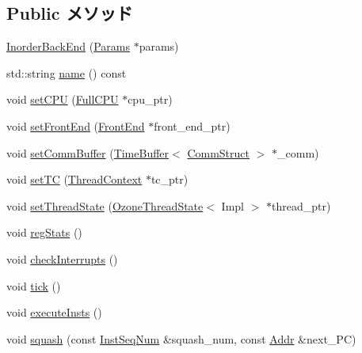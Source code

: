\subsection*{Public メソッド}
\begin{DoxyCompactItemize}
\item 
\hyperlink{classInorderBackEnd_ae2482e08cc2f4d90269bf53efd5193b7}{InorderBackEnd} (\hyperlink{classInorderBackEnd_a818e103eae798a24a06a0a34631849ea}{Params} $\ast$params)
\item 
std::string \hyperlink{classInorderBackEnd_a37627d5d5bba7f4a8690c71c2ab3cb07}{name} () const 
\item 
void \hyperlink{classInorderBackEnd_ad491c9766121fc19aa77fd0723e7641d}{setCPU} (\hyperlink{classInorderBackEnd_a90ba84e54618cc07f2e8f05e046cb5ce}{FullCPU} $\ast$cpu\_\-ptr)
\item 
void \hyperlink{classInorderBackEnd_a122009fa2730cee3898ac945227da8eb}{setFrontEnd} (\hyperlink{classFrontEnd}{FrontEnd} $\ast$front\_\-end\_\-ptr)
\item 
void \hyperlink{classInorderBackEnd_aeabdb9f0aae07df67c3029f8fddb2693}{setCommBuffer} (\hyperlink{classTimeBuffer}{TimeBuffer}$<$ \hyperlink{classInorderBackEnd_a82fb3c7183ba777a05c510ab2fbcfb82}{CommStruct} $>$ $\ast$\_\-comm)
\item 
void \hyperlink{classInorderBackEnd_ac6ccaaea6ac518cab92f71723b5a739e}{setTC} (\hyperlink{classThreadContext}{ThreadContext} $\ast$tc\_\-ptr)
\item 
void \hyperlink{classInorderBackEnd_a2a6551551e11d9e1947d6805e8322757}{setThreadState} (\hyperlink{structOzoneThreadState}{OzoneThreadState}$<$ Impl $>$ $\ast$thread\_\-ptr)
\item 
void \hyperlink{classInorderBackEnd_a4dc637449366fcdfc4e764cdf12d9b11}{regStats} ()
\item 
void \hyperlink{classInorderBackEnd_a53f309de2e633a8788fc67ba03d23675}{checkInterrupts} ()
\item 
void \hyperlink{classInorderBackEnd_a873dd91783f9efb4a590aded1f70d6b0}{tick} ()
\item 
void \hyperlink{classInorderBackEnd_a2d00e30d66a56e4667e28df302c98ac0}{executeInsts} ()
\item 
void \hyperlink{classInorderBackEnd_aa332542122e7959baf01e00f79e82bba}{squash} (const \hyperlink{inst__seq_8hh_a258d93d98edaedee089435c19ea2ea2e}{InstSeqNum} \&squash\_\-num, const \hyperlink{base_2types_8hh_af1bb03d6a4ee096394a6749f0a169232}{Addr} \&next\_\-PC)
\item 

\end{DoxyCompactItemize}
